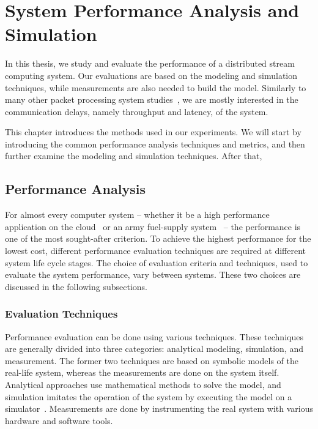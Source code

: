 \chapter{System Performance Analysis and Simulation}
\label{chapter:system-performance-analysis-and-simulation}

In this thesis, we study and evaluate the performance of a distributed stream computing system. Our evaluations are based on the modeling and simulation techniques, while measurements are also needed to build the model. Similarly to many other packet processing system studies~\cite{cavium:2010:fundamentals}, we are mostly interested in the communication delays, namely throughput and latency, of the system.

This chapter introduces the methods used in our experiments. We will start by introducing the common performance analysis techniques and metrics, and then further examine the modeling and simulation techniques. After that, 

\section{Performance Analysis}
For almost every computer system -- whether it be a high performance application on the cloud~\cite{jackson:2010:HPCOC} or an army fuel-supply system~\cite{sabuncuoglu:2005:TAS} -- the performance is one of the most sought-after criterion. To achieve the highest performance for the lowest cost, different performance evaluation techniques are required at different system life cycle stages. The choice of evaluation criteria and techniques, used to evaluate the system performance, vary between systems. These two choices are discussed in the following subsections.~\cite{jain:1991:AOCSPA}

\subsection{Evaluation Techniques}
Performance evaluation can be done using various techniques. These techniques are generally divided into three categories: analytical modeling, simulation, and measurement. The former two techniques are based on symbolic models of the real-life system, whereas the measurements are done on the system itself. Analytical approaches use mathematical methods to solve the model, and simulation imitates the operation of the system by executing the model on a simulator~\cite{Banks:2010:DES}. Measurements are done by instrumenting the real system with various hardware and software tools.~\cite{jain:1991:AOCSPA}

